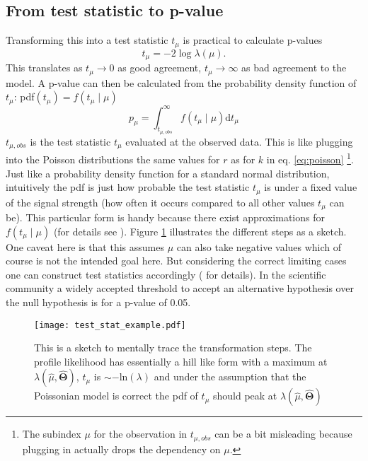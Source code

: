 \subsection{From test statistic to p-value}   
Transforming this into a test statistic $t_{\mu}$ is practical to calculate p-values
\begin{equation}
    t_{\mu}=-2\log \lambda(\mu).
\end{equation}
This translates as $t_{\mu} \rightarrow 0$ as good agreement, $t_{\mu} \rightarrow \infty$ as bad agreement to the model. A p-value can then be calculated from the probability density function of $t_\mu$: pdf$(t_\mu) = f(t_\mu \mid \mu)$
\begin{equation}\label{eq:p-value}
    p_\mu = \int_{t_{\mu ,obs}}^{\infty} 
    f(t_\mu \mid \mu) \mathrm{d}t_\mu
\end{equation}
$t_{\mu ,obs}$ is the test statistic $t_\mu$ evaluated at the observed data. This is like plugging into the Poisson distributions the same values for $r$ as for $k$ in eq. \ref{eq:poisson} \footnote{The subindex $\mu$ for the observation in $t_{\mu ,obs}$ can be a bit misleading because plugging in actually drops the dependency on $\mu$.}. Just like a probability density function for a standard normal distribution, intuitively the pdf is just how probable the test statistic $t_\mu$ is under a fixed value of the signal strength (how often it occurs compared to all other values $t_\mu$ can be). This particular form is handy because there exist approximations for $f(t_\mu \mid \mu)$ (for details see \citep{cowan2011asymptotic}). Figure \ref{fig:test_stat_example} illustrates the different steps as a sketch. One caveat here is that this assumes $\mu$ can also take negative values which of course is not the intended goal here. But considering the correct limiting cases one can construct test statistics accordingly (\citep{cowan2011asymptotic} for details). In the scientific community a widely accepted threshold to accept an alternative hypothesis over the null hypothesis is for a p-value of 0.05. 
\begin{figure}
    \centering
    \texttt{[image: test\_stat\_example.pdf]}
        \caption[]{This is a sketch to mentally trace the transformation steps. The profile likelihood has essentially a hill like form with a maximum at ${\lambda(\hat{\mu},\hat{\bm{\Theta}})}$, $t_\mu$ is $\sim \mathrm{-ln}(\lambda)$ and under the assumption that the Poissonian model is correct the pdf of $t_\mu$ should peak at ${\lambda(\hat{\mu},\hat{\bm{\Theta}})}$}
    \label{fig:test_stat_example}    
\end{figure}

